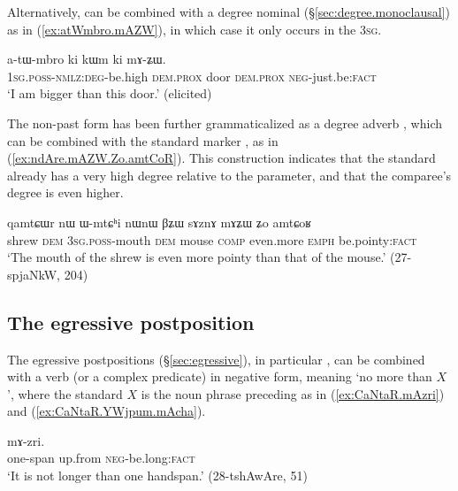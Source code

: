 Alternatively,  can be combined with a degree nominal (§\ref{sec:degree.monoclausal}) as in (\ref{ex:atWmbro.mAZW}), in which case it only occurs in the \textsc{3sg}.

\begin{exe}
\ex \label{ex:atWmbro.mAZW}
 \gll a-tɯ-mbro ki kɯm ki mɤ-ʑɯ. \\
 \textsc{1sg}.\textsc{poss}-\textsc{nmlz}:\textsc{deg}-be.high \textsc{dem}.\textsc{prox} door \textsc{dem}.\textsc{prox} \textsc{neg}-just.be:\textsc{fact} \\
\glt `I am bigger than this door.' (elicited)
\end{exe}

The non-past form  has been further grammaticalized as a degree adverb , which can be combined with the standard marker , as in (\ref{ex:ndAre.mAZW.Zo.amtCoR}). This construction indicates that the standard already has a very high degree relative to the parameter, and that the comparee's degree is even higher.

\begin{exe}
\ex \label{ex:ndAre.mAZW.Zo.amtCoR}
 \gll qamtɕɯr nɯ ɯ-mtɕʰi nɯnɯ βʑɯ sɤznɤ mɤʑɯ ʑo amtɕoʁ \\
 shrew \textsc{dem} \textsc{3sg}.\textsc{poss}-mouth \textsc{dem} mouse \textsc{comp} even.more \textsc{emph} be.pointy:\textsc{fact} \\
\glt `The mouth of the shrew is even more pointy than that of the mouse.' (27-spjaNkW, 204)
\end{exe}

\subsection{The egressive postposition } \label{sec:egressive.comparative}
The egressive postpositions (§\ref{sec:egressive}), in particular , can be combined with a verb (or a complex predicate) in negative form, meaning `no more than $X$', where the standard $X$ is the noun phrase preceding  as in (\ref{ex:CaNtaR.mAzri}) and (\ref{ex:CaNtaR.YWjpum.mAcha}).

\begin{exe}
\ex \label{ex:CaNtaR.mAzri}
  mɤ-zri. \\
 one-span up.from \textsc{neg}-be.long:\textsc{fact} \\
 \glt `It is not longer than one handspan.' (28-tshAwAre, 51)
 \end{exe}

